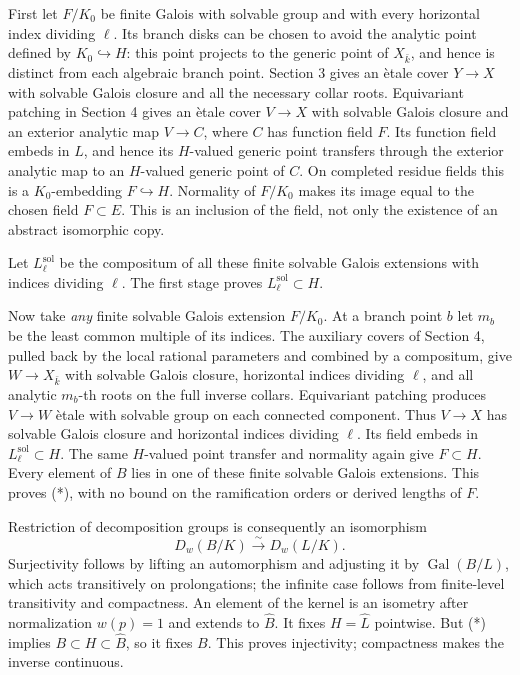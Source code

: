 First let $F/K_0$ be finite Galois with solvable group and with every
horizontal index dividing $\ell$.  Its branch disks can be chosen
to avoid the analytic point defined by $K_0\hookrightarrow H$:
this point projects to the generic point of $X_{\bar k}$, and hence
is distinct from each algebraic branch point.  Section 3 gives an
\`etale cover $Y\to X$ with solvable Galois closure and all the
necessary collar roots.  Equivariant patching in Section 4 gives
an \`etale cover $V\to X$ with solvable Galois closure and an
exterior analytic map $V\to C$, where $C$ has function field $F$.
Its function field embeds in $L$, and hence its $H$-valued generic
point transfers through the exterior analytic map to an $H$-valued
generic point of $C$.  On completed residue fields this is a
$K_0$-embedding $F\hookrightarrow H$.  Normality of $F/K_0$ makes
its image equal to the chosen field $F\subset E$.  This is an
inclusion of the field, not only the existence of an abstract
isomorphic copy.

Let $L_\ell^{\mathrm{sol}}$ be the compositum of all these finite
solvable Galois extensions with indices dividing $\ell$.  The first
stage proves $L_\ell^{\mathrm{sol}}\subset H$.

Now take \emph{any} finite solvable Galois extension $F/K_0$.
At a branch point $b$ let $m_b$ be the least common multiple of its
indices.  The auxiliary covers of Section 4, pulled back by the
local rational parameters and combined by a compositum, give
$W\to X_{\bar k}$ with solvable Galois closure, horizontal indices
dividing $\ell$, and all analytic $m_b$-th roots on the full inverse
collars.  Equivariant patching produces $V\to W$ \`etale with
solvable group on each connected component.  Thus $V\to X$ has
solvable Galois closure and horizontal indices dividing $\ell$.
Its field embeds in $L_\ell^{\mathrm{sol}}\subset H$.  The same
$H$-valued point transfer and normality again give $F\subset H$.
Every element of $B$ lies in one of these finite solvable Galois
extensions.  This proves (*), with no bound on the ramification
orders or derived lengths of $F$.

Restriction of decomposition groups is consequently an isomorphism
\[
                  D_w(B/K)\xrightarrow{\sim}D_w(L/K).       \tag{**}
\]
Surjectivity follows by lifting an automorphism and adjusting it by
$\operatorname{Gal}(B/L)$, which acts transitively on prolongations;
the infinite case follows from finite-level transitivity and
compactness.  An element of the kernel is an isometry after
normalization $w(p)=1$ and extends to $\widehat B$.  It fixes
$H=\widehat L$ pointwise.  But (*) implies
$B\subset H\subset\widehat B$, so it fixes $B$.  This proves
injectivity; compactness makes the inverse continuous.

